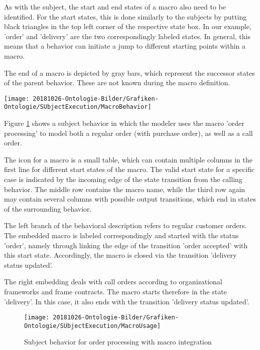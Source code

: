 As with the subject, the start and end states of a macro also need to be identified. For the start states, this is done similarly to the subjects by putting black triangles in the top left corner of the respective state box. In our example, 'order' and 'delivery' are the two correspondingly labeled states. In general, this means that a behavior can initiate a jump to different starting points within a macro.

The end of a macro is depicted by gray bars, which represent the successor states of the parent behavior. These are not known during the macro definition.

\begin{figure*}[htbp]
	\centering
	\texttt{[image: 20181026-Ontologie-Bilder/Grafiken-Ontologie/SUbjectExecution/MacroBehavior]}
	\caption[Behavior macro class 'request for approval']{Behavior macro class 'request for approval'}
	\label{fig:macrobehavior}
\end{figure*}

Figure \ref{fig:macrousage} shows a subject behavior in which the modeler uses the macro 'order processing' to model both a regular order (with purchase order), as well as a call order.

The icon for a macro is a small table, which can contain multiple columns in the first line for different start states of the macro. The valid start state for a specific case is indicated by the incoming edge of the state transition from the calling behavior. The middle row contains the macro name, while the third row again may contain several columns with possible output transitions, which end in states of the surrounding behavior.

The left branch of the behavioral description refers to regular customer orders. The embedded macro is labeled correspondingly and started with the status 'order', namely through linking the edge of the transition 'order accepted' with this start state. Accordingly, the macro is closed via the transition 'delivery status updated'.

The right embedding deals with call orders according to organizational frameworks and frame contracts. The macro starts therefore in the state 'delivery'. In this case, it also ends with the transition 'delivery status updated'.

\begin{figure}[htbp]
	\centering
	\texttt{[image: 20181026-Ontologie-Bilder/Grafiken-Ontologie/SUbjectExecution/MacroUsage]}
	\caption[Subject behavior for order processing with macro integration]{Subject behavior for order processing with macro integration}
	\label{fig:macrousage}
\end{figure}

